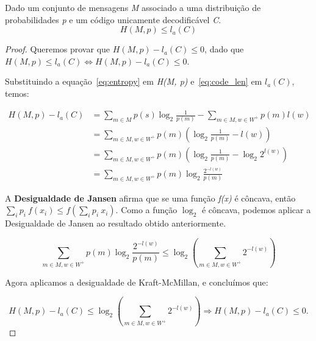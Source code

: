 \begin{lemma} Dado um conjunto de mensagens \emph{M} associado a uma distribuição de probabilidades \emph{p} e um código unicamente decodificável \emph{C}.
\begin{equation*}
H(M, p) \leq l_a(C)
\end{equation*}

\begin{proof}
Queremos provar que $H(M, p) - l_a(C) \leq 0$, dado que  $H(M, p) \leq l_a(C) \Leftrightarrow H(M, p) - l_a(C) \leq 0$.

Substituindo a equação~\ref{eq:entropy} em \emph{H(M, p)} e~\ref{eq:code_len} em \emph{$l_a(C)$}, temos:

\begin{align*}
H(M, p) - l_a(C) &= \sum_{m \in M}^{}p(s) \log_2 \frac{1}{p(m)}  - \sum_{m \in M, w \in W^+}^{}p(m) l(w) \\
&= \sum_{m \in M, w \in W^+}^{}p(m) \left(  \log_2 \frac{1}{p(m)} - l(w) \right) \\
&= \sum_{m \in M, w \in W^+}^{}p(m) \left(  \log_2 \frac{1}{p(m)} - \log_2 2^{l(w)} \right) \\
&= \sum_{m \in M, w \in W^+}^{}p(m) \log_2 \frac{2^{-l(w)}}{p(m)}
\end{align*}

A \textbf{Desigualdade de Jansen} afirma que se uma função \emph{f(x)} é côncava, então $\sum_{i}{}p_i~f(x_i) \leq f(\sum_{i}{}p_i~x_i)$. Como a função $\log_2$ é côncava, podemos aplicar a Desigualdade de Jansen ao resultado obtido anteriormente.

\begin{equation*}
\sum_{m \in M, w \in W^+}^{}p(m) \log_2 \frac{2^{-l(w)}}{p(m)}  \leq \log_2(\sum_{m \in M, w \in W^+}{}2^{-l(w)})
\end{equation*}

Agora aplicamos a desigualdade de Kraft-McMillan, e concluímos que:

\begin{equation*}
H(M, p) - l_a(C) \leq \log_2(\sum_{m \in M, w \in W^+}{}2^{-l(w)}) \Rightarrow H(M, p) - l_a(C) \leq 0.
\end{equation*}


\end{proof}

\end{lemma}

